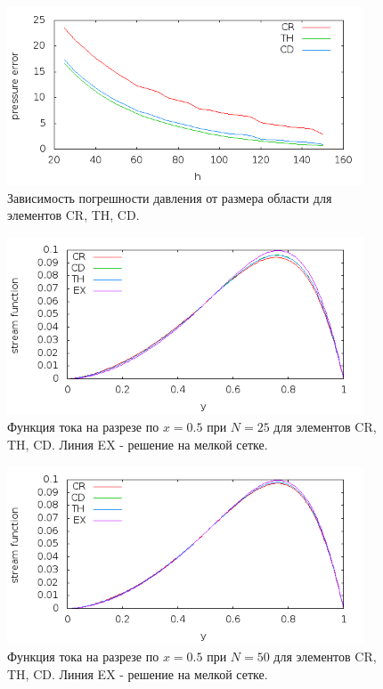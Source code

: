\documentclass[12pt]{article}
\begin{document}
\begin{figure}
	\begin{center}
		\includegraphics[width=400px]{pics/p_err}
		\caption{Зависимость погрешности давления от размера области для элементов CR, TH, CD.}
		\label{fg:p_err}
	\end{center}
\end{figure}

\begin{figure}
	\begin{center}
		\includegraphics[width=400px]{pics/psi_25}
		\caption{Функция тока на разрезе по $x=0.5$ при $N=25$ для элементов CR, TH, CD. Линия EX - решение на мелкой сетке.}
		\label{fg:psi_25}
	\end{center}
\end{figure}

\begin{figure}
	\begin{center}
		\includegraphics[width=400px]{pics/psi_50}
		\caption{Функция тока на разрезе по $x=0.5$ при $N=50$ для элементов CR, TH, CD. Линия EX - решение на мелкой сетке.}
		\label{fg:psi_50}
	\end{center}
\end{figure}
\end{document}
